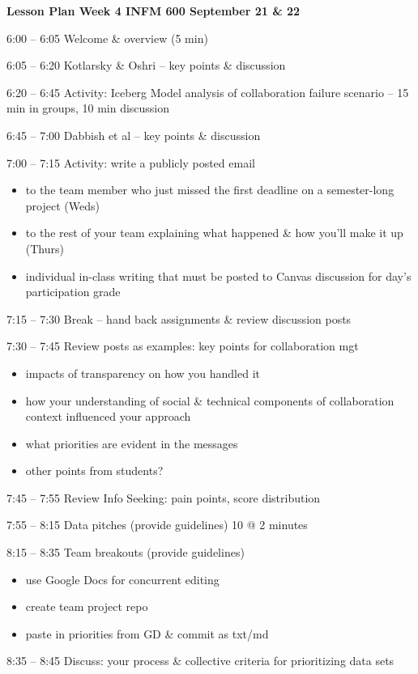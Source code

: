 \documentclass[]{article}
\date{}
\begin{document}
\textbf{Lesson Plan Week 4 INFM 600 September 21 \& 22}

6:00 -- 6:05 Welcome \& overview (5 min)

6:05 -- 6:20 Kotlarsky \& Oshri -- key points \& discussion

6:20 -- 6:45 Activity: Iceberg Model analysis of collaboration failure
scenario -- 15 min in groups, 10 min discussion

6:45 -- 7:00 Dabbish et al -- key points \& discussion

7:00 -- 7:15 Activity: write a publicly posted email

\begin{itemize}
\item
  to the team member who just missed the first deadline on a
  semester-long project (Weds)
\item
  to the rest of your team explaining what happened \& how you'll make
  it up (Thurs)
\item
  individual in-class writing that must be posted to Canvas discussion
  for day's participation grade
\end{itemize}

7:15 -- 7:30 Break -- hand back assignments \& review discussion posts

7:30 -- 7:45 Review posts as examples: key points for collaboration mgt

\begin{itemize}
\item
  impacts of transparency on how you handled it
\item
  how your understanding of social \& technical components of
  collaboration context influenced your approach
\item
  what priorities are evident in the messages
\item
  other points from students?
\end{itemize}

7:45 -- 7:55 Review Info Seeking: pain points, score distribution

7:55 -- 8:15 Data pitches (provide guidelines) 10 @ 2 minutes

8:15 -- 8:35 Team breakouts (provide guidelines)

\begin{itemize}
\item
  use Google Docs for concurrent editing
\item
  create team project repo
\item
  paste in priorities from GD \& commit as txt/md
\end{itemize}

8:35 -- 8:45 Discuss: your process \& collective criteria for
prioritizing data sets
\end{document}
